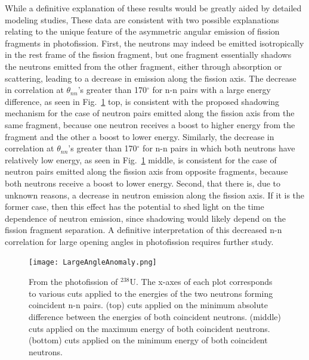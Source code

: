 While a definitive explanation of these results would be greatly aided by detailed modeling studies,
These data are consistent with two possible explanations relating to the unique feature of the asymmetric angular emission of fission fragments in photofission.
First, the neutrons may indeed be emitted isotropically in the rest frame of the fission fragment, but one fragment essentially shadows the neutrons emitted from the other fragment, either through absorption or scattering, leading to a decrease in emission along the fission axis.
The decrease in correlation at $\theta_{nn}$'s greater than 170$^{\circ}$ for n-n pairs with a large energy difference, as seen in Fig.~\ref{fig:LargeAngleAnomaly} top, is consistent with the proposed shadowing mechanism for the case of neutron pairs emitted along the fission axis from the same fragment, because one neutron receives a boost to higher energy from the fragment and the other a boost to lower energy.
Similarly, the decrease in correlation at $\theta_{nn}$'s greater than 170$^{\circ}$ for n-n pairs in which both neutrons have relatively low energy, as seen in Fig.~\ref{fig:LargeAngleAnomaly} middle, is consistent for the case of neutron pairs emitted along the fission axis from opposite fragments, because both neutrons receive a boost to lower energy.
Second, that there is, due to unknown reasons, a decrease in neutron emission along the fission axis.
If it is the former case, then this effect has the potential to shed light on the time dependence of neutron emission, since shadowing would likely depend on the fission fragment separation.
A definitive interpretation of this decreased n-n correlation for large opening angles in photofission requires further study.

\begin{figure}
\centering
    \texttt{[image: LargeAngleAnomaly.png]}
    \caption{From the photofission of $^{238}$U. The x-axes of each plot corresponds to various cuts applied to the energies of the two neutrons forming coincident n-n pairs.
     (top) cuts applied on the minimum absolute difference between the energies of both coincident neutrons. (middle) cuts applied on the maximum energy of both coincident neutrons. (bottom) cuts applied on the minimum energy of both coincident neutrons. }
    \label{fig:LargeAngleAnomaly}
\end{figure}


